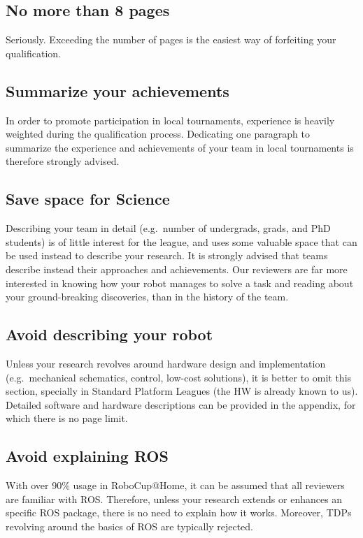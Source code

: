 \documentclass[runningheads,a4paper]{llncs}
\begin{document}
\subsection{No more than 8 pages}
Seriously. Exceeding the number of pages is the easiest way of forfeiting your qualification.

\subsection{Summarize your achievements}
In order to promote participation in local tournaments, experience is heavily weighted during the qualification process.
Dedicating one paragraph to summarize the experience and achievements of your team in local tournaments is therefore strongly advised.

\subsection{Save space for Science}
Describing your team in detail (e.g.~number of undergrads, grads, and PhD students) is of little interest for the league, and uses some valuable space that can be used instead to describe your research.
It is strongly advised that teams describe instead their approaches and achievements.
Our reviewers are far more interested in knowing how your robot manages to solve a task and reading about your ground-breaking discoveries, than in the history of the team.

\subsection{Avoid describing your robot}
Unless your research revolves around hardware design and implementation (e.g.~mechanical schematics, control, low-cost solutions), it is better to omit this section, specially in Standard Platform Leagues (the HW is already known to us).
Detailed software and hardware descriptions can be provided in the appendix, for which there is no page limit.

\subsection{Avoid explaining ROS}
With over 90\% usage in RoboCup@Home, it can be assumed that all reviewers are familiar with ROS.
Therefore, unless your research extends or enhances an specific ROS package, there is no need to explain how it works.
Moreover, TDPs revolving around the basics of ROS are typically rejected.
\end{document}
